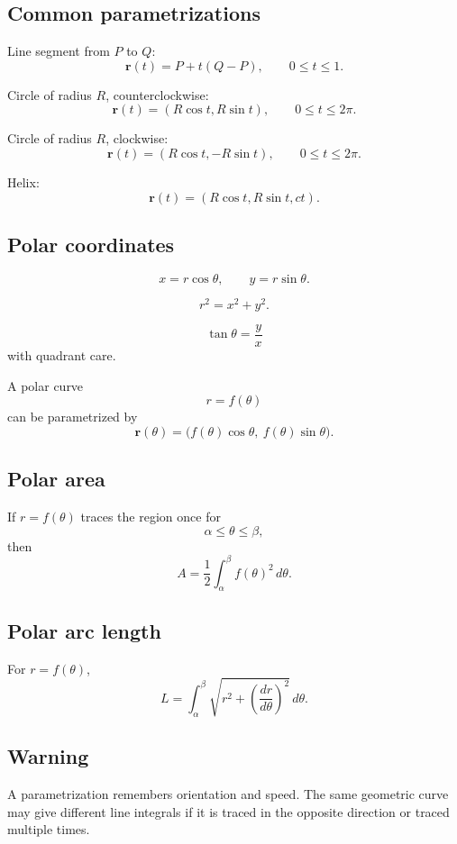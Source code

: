 \subsection*{Common parametrizations}

Line segment from \(P\) to \(Q\):
\[
\boxed{
    \mathbf r(t)=P+t(Q-P),
    \qquad
    0\le t\le1.
}
\]

Circle of radius \(R\), counterclockwise:
\[
\boxed{
    \mathbf r(t)=(R\cos t,R\sin t),
    \qquad
    0\le t\le2\pi.
}
\]

Circle of radius \(R\), clockwise:
\[
\boxed{
    \mathbf r(t)=(R\cos t,-R\sin t),
    \qquad
    0\le t\le2\pi.
}
\]

Helix:
\[
\boxed{
    \mathbf r(t)=(R\cos t,R\sin t,ct).
}
\]

\subsection*{Polar coordinates}

\[
\boxed{
    x=r\cos\theta,
    \qquad
    y=r\sin\theta.
}
\]

\[
\boxed{
    r^2=x^2+y^2.
}
\]

\[
\boxed{
    \tan\theta=\frac{y}{x}
}
\]
with quadrant care.

A polar curve
\[
    r=f(\theta)
\]
can be parametrized by
\[
\boxed{
    \mathbf r(\theta)
    =
    \bigl(f(\theta)\cos\theta,\ f(\theta)\sin\theta\bigr).
}
\]

\subsection*{Polar area}

If \(r=f(\theta)\) traces the region once for
\[
    \alpha\le\theta\le\beta,
\]
then
\[
\boxed{
    A=\frac12\int_\alpha^\beta f(\theta)^2\,d\theta.
}
\]

\subsection*{Polar arc length}

For \(r=f(\theta)\),
\[
\boxed{
    L=
    \int_\alpha^\beta
    \sqrt{
        r^2+\left(\frac{dr}{d\theta}\right)^2
    }
    \,d\theta.
}
\]

\subsection*{Warning}

A parametrization remembers orientation and speed.  The same geometric curve may give
different line integrals if it is traced in the opposite direction or traced multiple times.

